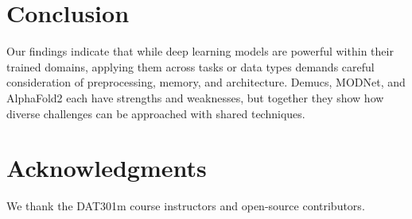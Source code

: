 \documentclass{article}
\begin{document}
\section{Conclusion}
Our findings indicate that while deep learning models are powerful within their trained domains, applying them across tasks or data types demands careful consideration of preprocessing, memory, and architecture. Demucs, MODNet, and AlphaFold2 each have strengths and weaknesses, but together they show how diverse challenges can be approached with shared techniques.

\section*{Acknowledgments}
We thank the DAT301m course instructors and open-source contributors.



\end{document}
